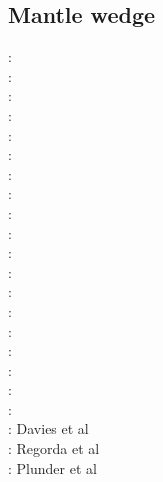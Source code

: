 \subsection{Mantle wedge} 

\begin{scriptsize}
\nineteensixtynine: \cite{mcke69}\\
\nineteenseventyone: \cite{tomj71}\\
\nineteenseventyeight: \cite{tosl78}\\
\nineteenseventynine: \cite{bobo79}\\
\nineteeneightyfive: \cite{hond85}\\
\nineteenninetytwo: \cite{dast92}\\
\nineteenninetythree: \cite{furu93}\\
\nineteenninetynine: \cite{pewa99}\\
\twothousandone: \cite{bigu01}\cite{haki01}\\
\twothousandtwo: \cite{vakp02}\\
\twothousandthree: \cite{vank03}\\
\twothousandfour: \cite{enwi04}\\
\twothousandsix: \cite{gogc06}\cite{gecy06}\\
\twothousandseven: \cite{gogc07}\cite{knvk07}\cite{lohd07}\\
\twothousandeight: \cite{knva08}\cite{cage08}\cite{vack08}\\
\twothousandnine: \cite{leki09}\cite{heaa09}\\
\twothousandten: \cite{roms10}\cite{hogz10}\cite{syab06}\\
\twothousandeleven: \cite{zhgh11}\\
\twothousandfourteen: \cite{ledg14}\cite{mabv14}\\
\twothousandsixteen: Davies et al \cite{dalg16} \\
\twothousandseventeen: Regorda et al \cite{rerm17}\\
\twothousandeighteen: Plunder et al \cite{pltv18}
\end{scriptsize}

